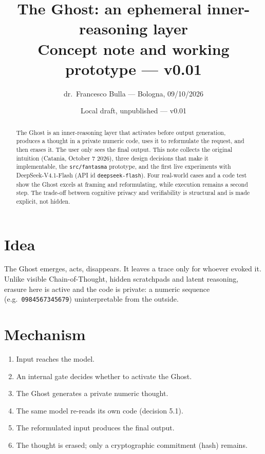 \documentclass[11pt,a4paper]{article}
\title{The Ghost: an ephemeral inner-reasoning layer\\ \large Concept note and working prototype --- v0.01}
\author{dr.\ Francesco Bulla --- Bologna, 09/10/2026}
\date{Local draft, unpublished --- v0.01}
\begin{document}
\maketitle

\begin{abstract}
The Ghost is an inner-reasoning layer that activates before output generation,
produces a thought in a private numeric code, uses it to reformulate the request,
and then erases it. The user only sees the final output. This note collects the
original intuition (Catania, October 7 2026), three design decisions that make it
implementable, the \texttt{src/fantasma} prototype, and the first live experiments with
DeepSeek-V4.1-Flash (API id \texttt{deepseek-flash}). Four real-world cases and a code
test show the Ghost excels at framing and reformulating, while execution remains a
second step. The trade-off between cognitive privacy and verifiability is structural
and is made explicit, not hidden.
\end{abstract}

\section{Idea}
The Ghost emerges, acts, disappears. It leaves a trace only for whoever evoked it.
Unlike visible Chain-of-Thought, hidden scratchpads and latent reasoning, erasure here
is active and the code is private: a numeric sequence (e.g.\ \texttt{0984567345679})
uninterpretable from the outside.

\section{Mechanism}
\begin{enumerate}
\item Input reaches the model.
\item An internal gate decides whether to activate the Ghost.
\item The Ghost generates a private numeric thought.
\item The same model re-reads its own code (decision 5.1).
\item The reformulated input produces the final output.
\item The thought is erased; only a cryptographic commitment (hash) remains.
\end{enumerate}
\end{document}
